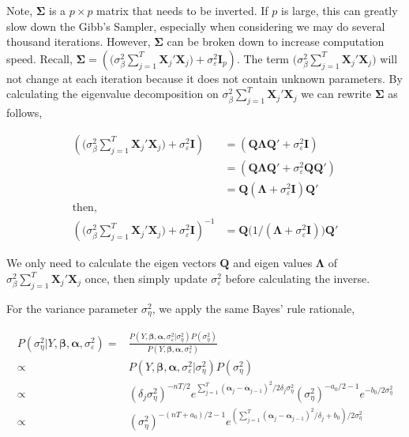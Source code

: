 \documentclass[
]{article}
\begin{document}
Note, \(\boldsymbol{\Sigma}\) is a \(p\times p\) matrix that needs to be inverted. If \(p\) is large, this can greatly slow down the Gibb's Sampler, especially when considering we may do several thousand iterations. However, \(\boldsymbol{\Sigma}\) can be broken down to increase computation speed. Recall, \(\boldsymbol{\Sigma} = (\big(\sigma^2_\beta\sum^T_{j=1}\boldsymbol{X}_j'\boldsymbol{X}_j\big)+\sigma^2_\varepsilon \boldsymbol{I}_p)\). The term \((\sigma^2_\beta\sum^T_{j=1}\boldsymbol{X}_j'\boldsymbol{X}_j\big)\) will not change at each iteration because it does not contain unknown parameters. By calculating the eigenvalue decomposition on \(\sigma^2_\beta\sum^T_{j=1}\boldsymbol{X}_j'\boldsymbol{X}_j\) we can rewrite \(\boldsymbol{\Sigma}\) as follows,

\begin{align*}
(\big(\sigma^2_\beta\sum^T_{j=1}\boldsymbol{X}_j'\boldsymbol{X}_j\big) + \sigma^{2}_\varepsilon \boldsymbol{I}) &=
( \boldsymbol{Q}\boldsymbol{\Lambda} \boldsymbol{Q}' + \sigma^{2}_\varepsilon \boldsymbol{I})\\
&=
( \boldsymbol{Q}\boldsymbol{\Lambda} \boldsymbol{Q}' + \sigma^{2}_\varepsilon \boldsymbol{Q}\boldsymbol{Q}')\\
&=
\boldsymbol{Q}(\boldsymbol{\Lambda} + \sigma^{2}_\varepsilon \boldsymbol{I})\boldsymbol{Q}'\\
\text{then,}\\
(\big(\sigma^2_\beta\sum^T_{j=1}\boldsymbol{X}_j'\boldsymbol{X}_j\big)+ \sigma^{2}_\varepsilon \boldsymbol{I})^{-1} &=
\boldsymbol{Q}\big(1/(\boldsymbol{\Lambda} + \sigma^{2}_\varepsilon \boldsymbol{I})\big) \boldsymbol{Q}'
\end{align*}

We only need to calculate the eigen vectors \(\boldsymbol{Q}\) and eigen values \(\boldsymbol{\Lambda}\) of \(\sigma^2_\beta\sum^T_{j=1}\boldsymbol{X}_j'\boldsymbol{X}_j\) once, then simply update \(\sigma^2_\varepsilon\) before calculating the inverse.

For the variance parameter \(\sigma^2_\eta\), we apply the same Bayes' rule rationale,

\begin{equation*}
\begin{aligned}
P(\sigma^2_\eta|Y, \boldsymbol{\beta}, \boldsymbol{\alpha}, \sigma^2_\varepsilon) =& \frac{P(Y, \boldsymbol{\beta}, \boldsymbol{\alpha}, \sigma^2_\varepsilon|\sigma^2_\eta)P(\sigma^2_\eta)}{P(Y, \boldsymbol{\beta}, \boldsymbol{\alpha}, \sigma^2_\varepsilon)}\\
\propto & P(Y, \boldsymbol{\beta}, \boldsymbol{\alpha}, \sigma^2_\varepsilon|\sigma^2_\eta)P(\sigma^2_\eta)\\
\propto & (\delta_j\sigma^2_\eta)^{-nT/2} e^{\sum^T_{j=1} (\boldsymbol{\alpha}_j-\boldsymbol{\alpha}_{j-1})^2/2\delta_j\sigma^2_\eta}(\sigma^2_\eta)^{-a_0/2-1}e^{-b_0/2\sigma^2_\eta}\\
\propto & (\sigma^2_\eta)^{-(nT+a_0)/2-1} e^{(\sum^T_{j=1} (\boldsymbol{\alpha}_j-\boldsymbol{\alpha}_{j-1})^2/\delta_j+b_0)/2\sigma^2_\eta}
\end{aligned}
\end{equation*}
\end{document}
